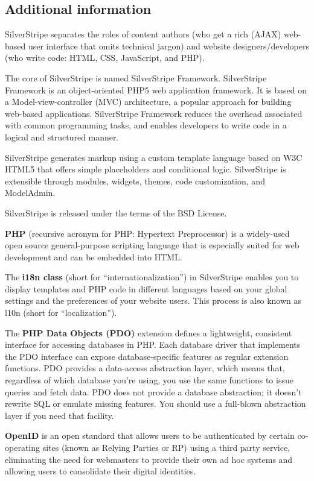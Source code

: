 \documentclass[11pt]{article}
\begin{document}
\subsection{Additional information}
SilverStripe separates the roles of content authors (who get a rich (AJAX) web-based user interface that omits technical jargon) and website designers/developers (who write code: HTML, CSS, JavaScript, and PHP).

The core of SilverStripe is named SilverStripe Framework. SilverStripe Framework is an object-oriented PHP5 web application framework. It is based on a Model-view-controller (MVC) architecture, a popular approach for building web-based applications. SilverStripe Framework reduces the overhead associated with common programming tasks, and enables developers to write code in a logical and structured manner.

SilverStripe generates markup using a custom template language based on W3C HTML5 that offers simple placeholders and conditional logic. SilverStripe is extensible through modules, widgets, themes, code customization, and ModelAdmin.

SilverStripe is released under the terms of the BSD License. 

\textbf{PHP} (recursive acronym for PHP: Hypertext Preprocessor) is a widely-used open source general-purpose scripting language that is especially suited for web development and can be embedded into HTML. 

The \textbf{i18n class }(short for ``internationalization'') in SilverStripe enables you to display templates and PHP code in different languages based on your global settings and the preferences of your website users. This process is also known as l10n (short for ``localization'').

The \textbf{PHP Data Objects (PDO)} extension defines a lightweight, consistent interface for accessing databases in PHP. Each database driver that implements the PDO interface can expose database-specific features as regular extension functions. PDO provides a data-access abstraction layer, which means that, regardless of which database you're using, you use the same functions to issue queries and fetch data. PDO does not provide a database abstraction; it doesn't rewrite SQL or emulate missing features. You should use a full-blown abstraction layer if you need that facility. 

\textbf{OpenID} is an open standard that allows users to be authenticated by certain co-operating sites (known as Relying Parties or RP) using a third party service, eliminating the need for webmasters to provide their own ad hoc systems and allowing users to consolidate their digital identities.
\end{document}
